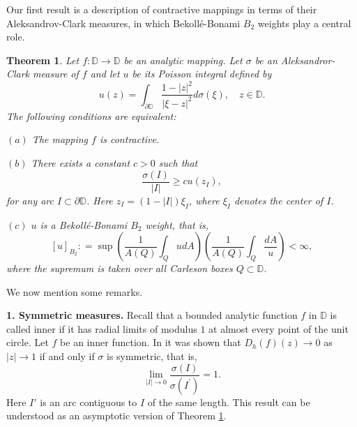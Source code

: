 \documentclass[a4paper,12pt]{article}
\newtheorem{theorem}{Theorem}[section]
\theoremstyle{definition}
\numberwithin{equation}{section}
\newcommand{\D}{\mathbb D}
\begin{document}
Our first result is a description of contractive mappings in terms of their Aleksandrov-Clark measures, in which Bekoll\'e-Bonami $B_2$ weights play a central role. 

\begin{theorem}
\label{B2weights}
    Let $f: \mathbb{D} \rightarrow \mathbb{D}$ be an analytic mapping. Let $\sigma$ be an Aleksandror-Clark measure of $f$ and let $u$ be its Poisson integral defined by 
    $$
u (z) = \int_{\partial \D} \frac{1-|z|^2}{|\xi - z|^2} d \sigma (\xi), \quad z \in \D. 
$$
The following conditions are equivalent:

$(a)$ The mapping $f$ is contractive.

$(b)$ There exists a constant $c>0$ such that
\begin{equation}
\label{boxest}
   \frac{\sigma(I)}{|I|} \geqslant c u \left(z_{I}\right) ,  
\end{equation}
for any arc $ I \subset \partial \mathbb{D}$. Here $z_{I}=(1-|I|) \xi_{I}$, where $\xi_{I}$ denotes the center of $I$.

$(c)$ $u$ is a Bekoll\'e-Bonami $B_2$ weight, that is,
$$
[u]_{B_2} : =\sup \left(\frac{1}{A(Q)} \int_{Q} u d A\right)\left( \frac{1}{A(Q)} \int_{Q} \frac{dA}{u} \right)<\infty, 
$$
where the supremum is taken over all Carleson boxes $Q \subset \mathbb{D}$.

\end{theorem}


We now mention some remarks. 

\textbf{1. Symmetric measures.} Recall that a bounded analytic function $f$ in $\D$ is called inner if it has radial limits of modulus $1$ at almost every point of the unit circle. Let $f$ be an inner function. In \cite{AAN} it was shown that $D_h (f) (z) \rightarrow 0$ as $|z| \rightarrow 1$ if and only if $\sigma$ is symmetric, that is,
$$
\lim _{|I| \rightarrow 0} \frac{\sigma(I)}{\sigma\left(I^{\prime}\right)}=1 .
$$
Here $I'$ is an arc contiguous to $I$ of the same length. This result can be understood as an asymptotic version of Theorem \ref{B2weights}.
\end{document}
